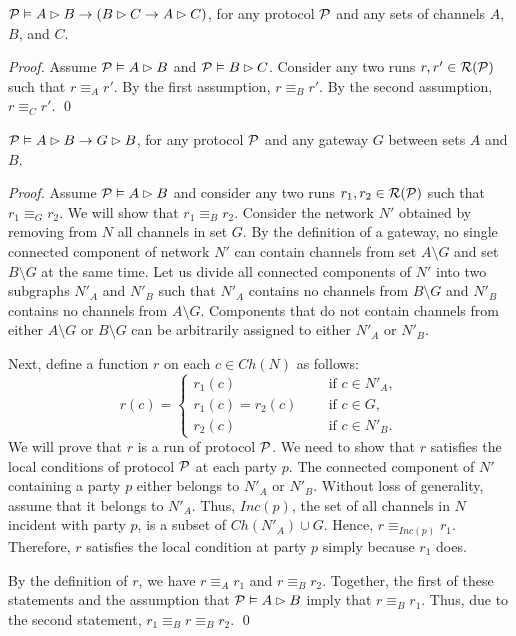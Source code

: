 \documentclass{llncs}
\newcommand{\rr}{{\cal R}}
\newcommand{\pp}{{\cal P}}
\begin{document}
\begin{theorem}[Transitivity]\label{}
$\pp \vDash A\rhd B \rightarrow (B\rhd C \rightarrow A\rhd C)$, for any protocol $\pp$ and any sets of channels $A$, $B$, and $C$.
\end{theorem}
\begin{proof}
Assume $\pp \vDash A\rhd B$ and $\pp \vDash B\rhd C$. Consider any two runs $r,r'\in \rr(\pp)$ such that $r\equiv_{A}r'$.
By the first assumption, $r\equiv_{B}r'$. By the second assumption, $r\equiv_{C}r'$. \qed
\end{proof}

\begin{theorem}[Gateway]\label{}
$\pp \vDash A\rhd B \rightarrow G \rhd B$, for any protocol $\pp$ and any gateway $G$ between sets $A$ and $B$.
\end{theorem}
\begin{proof}
Assume $\pp \vDash A\rhd B$ and consider any two runs $r_1,r_2\in \rr(\pp)$ such that $r_1\equiv_{G}r_2$. We will show that $r_1\equiv_{B}r_2$.
Consider the network $N'$ obtained by removing from $N$ all channels in set $G$. By the definition of a gateway, no single connected component of network $N'$ can contain channels from set $A\setminus G$ and set $B\setminus G$ at the same time. Let us divide all connected components of $N'$ into two subgraphs $N'_A$ and $N'_B$ such that $N'_A$ contains no channels from $B\setminus G$ and $N'_B$ contains no channels from $A\setminus G$. Components that do not contain channels from either $A\setminus G$ or $B\setminus G$ can be arbitrarily assigned to either $N'_A$ or $N'_B$.

Next, define a function $r$ on each $c \in Ch(N)$ as follows:
$$r(c)=\left\{\begin{array}{ll}
                            r_1(c)     & \mbox{ if $c\in N'_A$},\\
                            r_1(c)=r_2(c)\;\;\;\; & \mbox{ if $c\in G$},\\
                            r_2(c)     & \mbox{ if $c\in N'_B$}.
                            \end{array}
                     \right. $$
We will prove that $r$ is a run of protocol $\pp$. We need to show that $r$ satisfies the local conditions of protocol $\pp$ at each party $p$. The connected component of $N'$ containing a party $p$ either belongs to $N'_A$ or $N'_B$. Without loss of generality, assume that it belongs to $N'_A$. Thus, $Inc(p)$, the set of all channels in $N$ incident with party $p$, is a subset of $Ch(N'_A)\cup G$. Hence, $r\equiv_{Inc(p)}r_1$. Therefore, $r$ satisfies the local condition at party $p$ simply because $r_1$ does.

By the definition of $r$, we have $r\equiv_A r_1$ and $r\equiv_B r_2$. Together, the first of these statements and the assumption that $\pp\vDash A\rhd B$ imply that $r\equiv_B r_1$. Thus, due to the second statement, $r_1\equiv_B r \equiv_B r_2$. \qed

\end{proof}
\end{document}
